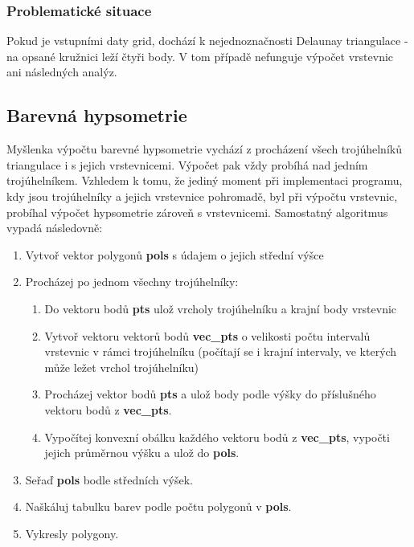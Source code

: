 \documentclass[a4paper, 12pt]{article}
\begin{document}
\subsubsection{Problematické situace}
Pokud je vstupními daty grid, dochází k nejednoznačnosti Delaunay triangulace - na opsané kružnici leží čtyři body. V tom případě nefunguje výpočet vrstevnic ani následných analýz.




\subsection{Barevná hypsometrie}
Myšlenka výpočtu barevné hypsometrie vychází z procházení všech trojúhelníků triangulace i s jejich vrstevnicemi. Výpočet pak vždy probíhá nad jedním trojúhelníkem. Vzhledem k tomu, že jediný moment při implementaci programu, kdy jsou trojúhelníky a jejich vrstevnice pohromadě, byl při výpočtu vrstevnic, probíhal výpočet hypsometrie zároveň s vrstevnicemi. Samostatný algoritmus vypadá následovně:

\begin{enumerate}
	\item Vytvoř vektor polygonů \textbf{pols} s údajem o jejich střední výšce
	\item Procházej po jednom všechny trojúhelníky:
		\begin{enumerate}
			\item Do vektoru bodů \textbf{pts} ulož vrcholy trojúhelníku a krajní body vrstevnic
			\item Vytvoř vektoru vektorů bodů \textbf{vec_pts} o velikosti počtu intervalů vrstevnic v rámci trojúhelníku (počítají se i krajní intervaly, ve kterých může ležet vrchol trojúhelníku)
			\item Procházej vektor bodů \textbf{pts} a ulož body podle výšky do příslušného vektoru bodů z \textbf{vec_pts}.
			\item Vypočítej konvexní obálku každého vektoru bodů z \textbf{vec_pts}, vypočti jejich průměrnou výšku a ulož do \textbf{pols}. 
		\end{enumerate}
	\item Seřaď \textbf{pols} bodle středních výšek.
	\item Naškáluj tabulku barev podle počtu polygonů v \textbf{pols}.
	\item Vykresly polygony.
\end{enumerate}
\end{document}
